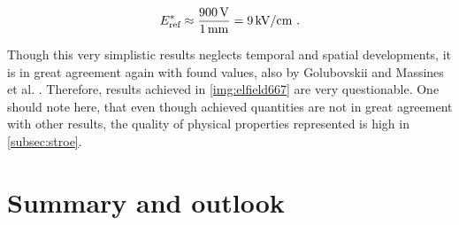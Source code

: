 \documentclass[a4paper,10pt,twoside]{article}
\newcommand{\ix}[1]{_\text{#1}}
\begin{document}
			\begin{align}
				E^*\ix{ref}\approx\frac{\unit[900]{V}}{\unit[1]{mm}}=\unit[9]{kV/cm}\,\,. \nonumber
			\end{align}
		
		Though this very simplistic results neglects temporal and spatial developments, it is in great agreement again with found values, also by Golubovskii and Massines et al. \cite{Massines} \cite{0022-3727-36-1-306}. Therefore, results achieved in \autoref{img:elfield667} are very questionable. One should note here, that even though achieved quantities are not in great agreement with other results, the quality of physical properties represented is high in \autoref{subsec:stroe}.
		
	\section{Summary and outlook}
	
\end{document}

